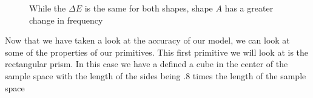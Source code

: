 \documentclass[authoryearcitations]{UoYCSproject}
\begin{document}
\begin{figure}
\centering
{}
\caption{While the $\Delta E$ is the same for both shapes, shape $A$ has a greater change in frequency}
\label{deltaE}
\end{figure}


Now that we have taken a look at the accuracy of our model, we can look at some of the properties of our primitives. 
This first primitive we will look at is the rectangular prism. In this case we have a defined a cube in the center of the
sample space with the length of the sides being $.8$ times the length of the sample space
\end{document}
